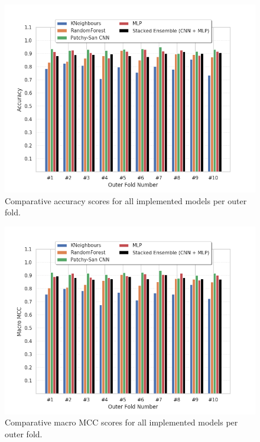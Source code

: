     \begin{figure}[H]
  \centering
  \centerline{\includegraphics[scale=0.8]{Images/acc_per_fold_new_cols.png}}
  \caption{Comparative accuracy scores for all implemented models per outer fold.}
  \label{acc_per_fold}
\end{figure}

\begin{figure}[H]
  \centering
  \centerline{\includegraphics[scale=0.8]{Images/macro_mcc_per_fold_new_cols.png}}
  \caption{Comparative macro MCC scores for all implemented models per outer fold.}
  \label{macro_mcc_per_fold}
\end{figure}

